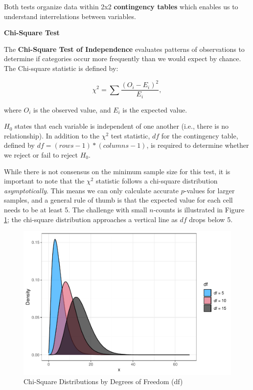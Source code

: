 \documentclass[
]{book}
\begin{document}
Both tests organize data within 2x2 \textbf{contingency tables} which enables us to understand interrelations between variables.

\textbf{Chi-Square Test}

The \textbf{Chi-Square Test of Independence} evaluates patterns of observations to determine if categories occur more frequently than we would expect by chance. The Chi-square statistic is defined by:

\[ {\chi}^2 = \sum\frac{(O_i - E_i)^2}{E_i}, \]

where \(O_i\) is the observed value, and \(E_i\) is the expected value.

\(H_0\) states that each variable is independent of one another (i.e., there is no relationship). In addition to the \({\chi}^2\) test statistic, \(df\) for the contingency table, defined by \(df = (rows - 1) * (columns - 1)\), is required to determine whether we reject or fail to reject \(H_0\).

While there is not consensus on the minimum sample size for this test, it is important to note that the \({\chi}^2\) statistic follows a chi-square distribution \emph{asymptotically}. This means we can only calculate accurate \(p\)-values for larger samples, and a general rule of thumb is that the expected value for each cell needs to be at least 5. The challenge with small \(n\)-counts is illustrated in Figure \ref{fig:chisq-dist}; the chi-square distribution approaches a vertical line as \(df\) drops below 5.

\begin{figure}

{\centering \includegraphics[width=1\linewidth]{People_Analytics_Lifecycle_files/figure-latex/chisq-dist-1} 

}

\caption{Chi-Square Distributions by Degrees of Freedom (df)}\label{fig:chisq-dist}
\end{figure}
\end{document}
